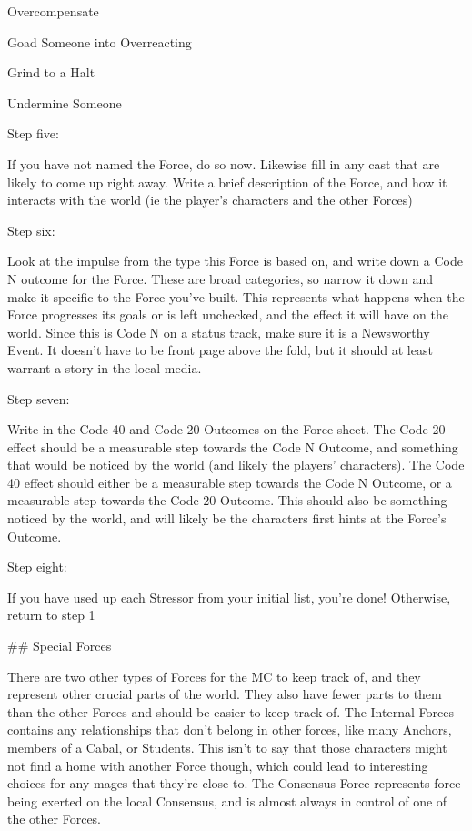\documentclass[
  oneside,
  statementpaper,
  9pt]{memoir}
\begin{document}
\begin{MC}
\begin{itemize*}
\item Overcompensate 
\item Goad Someone into Overreacting 
\item Grind to a Halt 
\item Undermine Someone

\end{itemize*}

Step five:

If you have not named the Force, do so now. Likewise fill in any cast that are likely to come up right away. Write a brief description of the Force, and how it interacts with the world (ie the player’s characters and the other Forces)

Step six:

Look at the impulse from the type this Force is based on, and write down a Code N outcome for the Force. These are broad categories, so narrow it down and make it specific to the Force you’ve built. This represents what happens when the Force progresses its goals or is left unchecked, and the effect it will have on the world. Since this is Code N on a status track, make sure it is a Newsworthy Event. It doesn’t have to be front page above the fold, but it should at least warrant a story in the local media.

Step seven:

Write in the Code 40 and Code 20 Outcomes on the Force sheet. The Code 20 effect should be a measurable step towards the Code N Outcome, and something that would be noticed by the world (and likely the players’ characters). The Code 40 effect should either be a measurable step towards the Code N Outcome, or a measurable step towards the Code 20 Outcome. This should also be something noticed by the world, and will likely be the characters first hints at the Force’s Outcome. 

Step eight:

If you have used up each Stressor from your initial list, you’re done! Otherwise, return to step 1

## Special Forces

There are two other types of Forces for the MC to keep track of, and they represent other crucial parts of the world. They also have fewer parts to them than the other Forces and should be easier to keep track of. The Internal Forces contains any relationships that don’t belong in other forces, like many Anchors, members of a Cabal, or Students. This isn’t to say that those characters might not find a home with another Force though, which could lead to interesting choices for any mages that they’re close to. The Consensus Force represents force being exerted on the local Consensus, and is almost always in control of one of the other Forces.


\end{MC}
\end{document}
